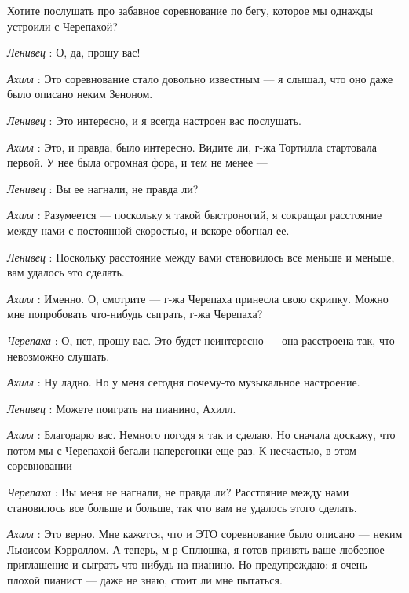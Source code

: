 \documentclass[../main.tex]{subfiles}
\begin{document}


\begin{dialogue}

 Хотите послушать про забавное соревнование по бегу, которое мы однажды устроили с Черепахой?

\emph{Ленивец} : О, да, прошу вас!

\emph{Ахилл} : Это соревнование стало довольно известным --- я слышал, что оно даже было описано неким Зеноном.

\emph{Ленивец} : Это интересно, и я всегда настроен вас послушать.

\emph{Ахилл} : Это, и правда, было интересно. Видите ли, г-жа Тортилла стартовала первой. У нее была огромная фора, и тем не менее ---

\emph{Ленивец} : Вы ее нагнали, не правда ли?

\emph{Ахилл} : Разумеется --- поскольку я такой быстроногий, я сокращал расстояние между нами с постоянной скоростью, и вскоре обогнал ее.

\emph{Ленивец} : Поскольку расстояние между вами становилось все меньше и меньше, вам удалось это сделать.

\emph{Ахилл} : Именно. О, смотрите --- г-жа Черепаха принесла свою скрипку. Можно мне попробовать что-нибудь сыграть, г-жа Черепаха?

\emph{Черепаха} : О, нет, прошу вас. Это будет неинтересно --- она расстроена так, что невозможно слушать.

\emph{Ахилл} : Ну ладно. Но у меня сегодня почему-то музыкальное настроение.

\emph{Ленивец} : Можете поиграть на пианино, Ахилл.

\emph{Ахилл} : Благодарю вас. Немного погодя я так и сделаю. Но сначала доскажу, что потом мы с Черепахой бегали наперегонки еще раз. К несчастью, в этом соревновании ---

\emph{Черепаха} : Вы меня не нагнали, не правда ли? Расстояние между нами становилось все больше и больше, так что вам не удалось этого сделать.

\emph{Ахилл} : Это верно. Мне кажется, что и ЭТО соревнование было описано --- неким Льюисом Кэрроллом. А теперь, м-р Сплюшка, я готов принять ваше любезное приглашение и сыграть что-нибудь на пианино. Но предупреждаю: я очень плохой пианист --- даже не знаю, стоит ли мне пытаться.


\end{dialogue}
\end{document}
